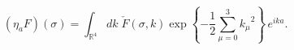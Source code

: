 \begin{equation}
\label{loc_map} (\eta_a F)(\sigma)= \int_{\mathbb R^4} dk\;\check %
F(\sigma,k) \exp\left\{-\frac {1}{2} \sum_{\mu=0}^3{k_\mu}^2
\right\}\,e^{ika}.
\end{equation}

